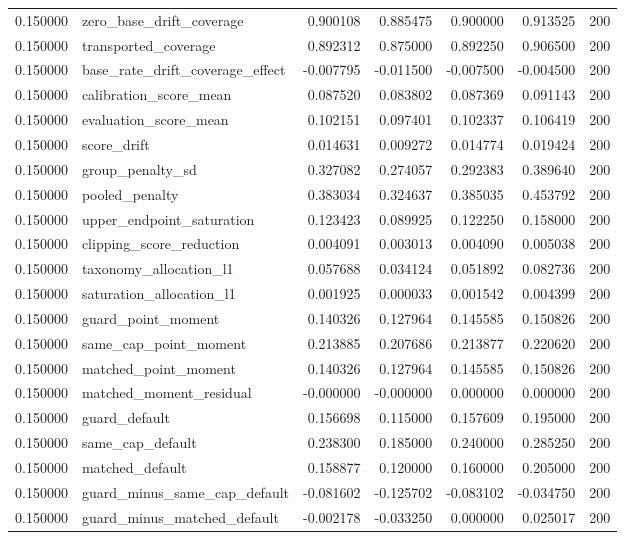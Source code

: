\begin{tabular}{rlrrrrr}
0.150000 & zero\_base\_drift\_coverage & 0.900108 & 0.885475 & 0.900000 & 0.913525 & 200 \\
0.150000 & transported\_coverage & 0.892312 & 0.875000 & 0.892250 & 0.906500 & 200 \\
0.150000 & base\_rate\_drift\_coverage\_effect & -0.007795 & -0.011500 & -0.007500 & -0.004500 & 200 \\
0.150000 & calibration\_score\_mean & 0.087520 & 0.083802 & 0.087369 & 0.091143 & 200 \\
0.150000 & evaluation\_score\_mean & 0.102151 & 0.097401 & 0.102337 & 0.106419 & 200 \\
0.150000 & score\_drift & 0.014631 & 0.009272 & 0.014774 & 0.019424 & 200 \\
0.150000 & group\_penalty\_sd & 0.327082 & 0.274057 & 0.292383 & 0.389640 & 200 \\
0.150000 & pooled\_penalty & 0.383034 & 0.324637 & 0.385035 & 0.453792 & 200 \\
0.150000 & upper\_endpoint\_saturation & 0.123423 & 0.089925 & 0.122250 & 0.158000 & 200 \\
0.150000 & clipping\_score\_reduction & 0.004091 & 0.003013 & 0.004090 & 0.005038 & 200 \\
0.150000 & taxonomy\_allocation\_l1 & 0.057688 & 0.034124 & 0.051892 & 0.082736 & 200 \\
0.150000 & saturation\_allocation\_l1 & 0.001925 & 0.000033 & 0.001542 & 0.004399 & 200 \\
0.150000 & guard\_point\_moment & 0.140326 & 0.127964 & 0.145585 & 0.150826 & 200 \\
0.150000 & same\_cap\_point\_moment & 0.213885 & 0.207686 & 0.213877 & 0.220620 & 200 \\
0.150000 & matched\_point\_moment & 0.140326 & 0.127964 & 0.145585 & 0.150826 & 200 \\
0.150000 & matched\_moment\_residual & -0.000000 & -0.000000 & 0.000000 & 0.000000 & 200 \\
0.150000 & guard\_default & 0.156698 & 0.115000 & 0.157609 & 0.195000 & 200 \\
0.150000 & same\_cap\_default & 0.238300 & 0.185000 & 0.240000 & 0.285250 & 200 \\
0.150000 & matched\_default & 0.158877 & 0.120000 & 0.160000 & 0.205000 & 200 \\
0.150000 & guard\_minus\_same\_cap\_default & -0.081602 & -0.125702 & -0.083102 & -0.034750 & 200 \\
0.150000 & guard\_minus\_matched\_default & -0.002178 & -0.033250 & 0.000000 & 0.025017 & 200 \\

\end{tabular}
